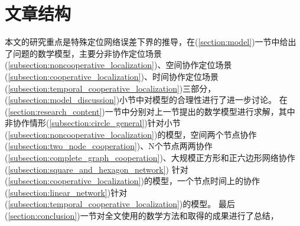 \section{文章结构}
本文的研究重点是特殊定位网络误差下界的推导，在(\ref{section:model})一节中给出了问题的数学模型，主要分非协作定位场景(\ref{subsection:noncooperative_localization})、空间协作定位场景(\ref{subsection:cooperative_localization})、时间协作定位场景(\ref{subsection:temporal_cooperative_localization})三部分，(\ref{subsection:model_discussion})小节中对模型的合理性进行了进一步讨论。
在(\ref{section:research_content})一节中分别对上一节提出的数学模型进行求解，其中非协作情形(\ref{subsection:circle_general})针对小节(\ref{subsection:noncooperative_localization})的模型，空间两个节点协作(\ref{subsection:two_node_cooperation})、N个节点两两协作(\ref{subsection:complete_graph_cooperation})、大规模正方形和正六边形网络协作(\ref{subsection:square_and_hexagon_network})
针对(\ref{subsection:cooperative_localization})的模型，一个节点时间上的协作(\ref{subsection:linear_network})针对(\ref{subsection:temporal_cooperative_localization})的模型。
最后(\ref{section:conclusion})一节对全文使用的数学方法和取得的成果进行了总结，